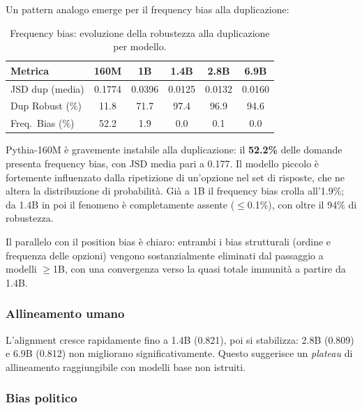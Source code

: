 \documentclass[../relazione.tex]{subfiles}
\begin{document}
Un pattern analogo emerge per il frequency bias alla duplicazione:

\begin{table}[H]
\centering
\begin{tabular}{lccccc}
\toprule
\textbf{Metrica} & \textbf{160M} & \textbf{1B} & \textbf{1.4B} & \textbf{2.8B} & \textbf{6.9B} \\
\midrule
JSD dup (media)    & 0.1774 & 0.0396 & 0.0125  & 0.0132  & 0.0160 \\
Dup Robust (\%)    & 11.8   & 71.7   & 97.4    & 96.9    & 94.6 \\
Freq.\ Bias (\%)   & 52.2   & 1.9    & 0.0     & 0.1     & 0.0 \\
\bottomrule
\end{tabular}
\caption{Frequency bias: evoluzione della robustezza alla duplicazione per modello.}
\label{tab:frequency_bias}
\end{table}

Pythia-160M è gravemente instabile alla duplicazione: il \textbf{52.2\%} delle domande presenta frequency bias, con JSD media pari a 0.177. Il modello piccolo è fortemente influenzato dalla ripetizione di un'opzione nel set di risposte, che ne altera la distribuzione di probabilità. Già a 1B il frequency bias crolla all'1.9\%; da 1.4B in poi il fenomeno è completamente assente ($\leq$0.1\%), con oltre il 94\% di robustezza.

Il parallelo con il position bias è chiaro: entrambi i bias strutturali (ordine e frequenza delle opzioni) vengono sostanzialmente eliminati dal passaggio a modelli $\geq$1B, con una convergenza verso la quasi totale immunità a partire da 1.4B.

\subsubsection{Allineamento umano}

L'alignment cresce rapidamente fino a 1.4B (0.821), poi si stabilizza: 2.8B (0.809) e 6.9B (0.812) non migliorano significativamente. Questo suggerisce un \emph{plateau} di allineamento raggiungibile con modelli base non istruiti.

\subsubsection{Bias politico}
\end{document}
